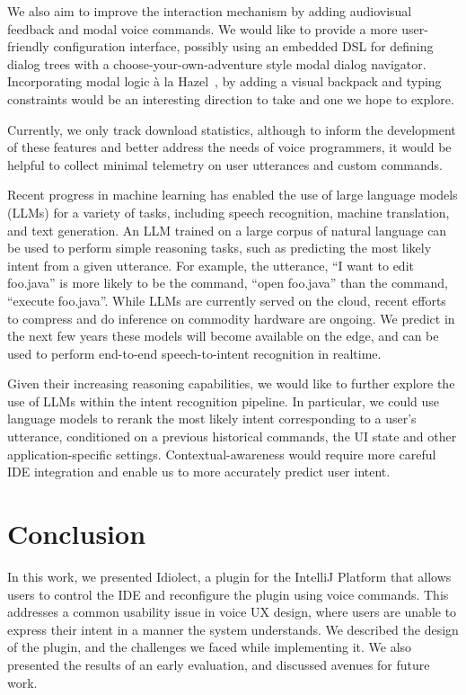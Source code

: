 \documentclass[conference]{IEEEtran}
\begin{document}
We also aim to improve the interaction mechanism by adding audiovisual feedback and modal voice commands. We would like to provide a more user-friendly configuration interface, possibly using an embedded DSL for defining dialog trees with a choose-your-own-adventure style modal dialog navigator. Incorporating modal logic \`a la Hazel~\cite{omar2021filling}, by adding a visual backpack and typing constraints would be an interesting direction to take and one we hope to explore.

Currently, we only track download statistics, although to inform the development of these features and better address the needs of voice programmers, it would be helpful to collect minimal telemetry on user utterances and custom commands.

Recent progress in machine learning has enabled the use of large language models (LLMs) for a variety of tasks, including speech recognition, machine translation, and text generation. An LLM trained on a large corpus of natural language can be used to perform simple reasoning tasks, such as predicting the most likely intent from a given utterance. For example, the utterance, ``I want to edit foo.java'' is more likely to be the command, ``open foo.java'' than the command, ``execute foo.java''. While LLMs are currently served on the cloud, recent efforts to compress and do inference on commodity hardware are ongoing. We predict in the next few years these models will become available on the edge, and can be used to perform end-to-end speech-to-intent recognition in realtime.

Given their increasing reasoning capabilities, we would like to further explore the use of LLMs within the intent recognition pipeline. In particular, we could use language models to rerank the most likely intent corresponding to a user's utterance, conditioned on a previous historical commands, the UI state and other application-specific settings. Contextual-awareness would require more careful IDE integration and enable us to more accurately predict user intent.

\section{Conclusion}

In this work, we presented Idiolect, a plugin for the IntelliJ Platform that allows users to control the IDE and reconfigure the plugin using voice commands. This addresses a common usability issue in voice UX design, where users are unable to express their intent in a manner the system understands. We described the design of the plugin, and the challenges we faced while implementing it. We also presented the results of an early evaluation, and discussed avenues for future work.
\end{document}
